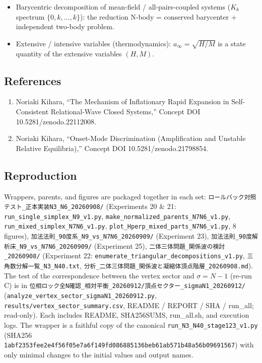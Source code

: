 \documentclass[
  a4paper,
]{ltjsarticle}
\providecommand{\tightlist}{%
  \setlength{\itemsep}{0pt}\setlength{\parskip}{0pt}}
\begin{document}
\begin{itemize}
\tightlist
\item
  Barycentric decomposition of mean-field / all-pairs-coupled systems
  (\(K_k\) spectrum \(\{0,k,\ldots,k\}\)): the reduction N-body =
  conserved barycenter + independent two-body problem.
\item
  Extensive / intensive variables (thermodynamics):
  \(a_\infty=\sqrt{H/M}\) is a state quantity of the extensive variables
  \((H,M)\).
\end{itemize}

\subsection{References}\label{references}

\begin{enumerate}
\def\labelenumi{\arabic{enumi}.}
\tightlist
\item
  Noriaki Kihara, ``The Mechanism of Inflationary Rapid Expansion in
  Self-Consistent Relational-Wave Closed Systems,'' Concept DOI
  10.5281/zenodo.22112008.
\item
  Noriaki Kihara, ``Onset-Mode Discrimination (Amplification and
  Unstable Relative Equilibria),'' Concept DOI 10.5281/zenodo.21798854.
\end{enumerate}

\subsection{Reproduction}\label{reproduction}

Wrappers, parents, and figures are packaged together in each set:
\texttt{ロールバック対照テスト\_正本実装N3\_N6\_20260908/} (Experiments
20 \& 21: \texttt{run\_single\_simplex\_N9\_v1.py},
\texttt{make\_normalized\_parents\_N7N6\_v1.py},
\texttt{run\_mixed\_simplex\_N7N6\_v1.py},
\texttt{plot\_Hperp\_mixed\_parts\_N7N6\_v1.py}, 8 figures),
\texttt{加法法則\_90度系\_N9\_vs\_N7N6\_20260909/} (Experiment 23),
\texttt{加法法則\_90度解析床\_N9\_vs\_N7N6\_20260909/} (Experiment 25),
\texttt{二体三体問題\_関係波の検討\_20260908/} (Experiment 22:
\texttt{enumerate\_triangular\_decompositions\_v1.py},
\texttt{三角数分解一覧\_N3\_N40.txt},
\texttt{分析\_二体三体問題\_関係波と凝縮体頂点階層\_20260908.md}). The
test of the correspondence between the vertex sector and \(\sigma=N-1\)
(re-run C) is in
\texttt{位相ロック全N確認\_相対平衡\_20260912/頂点セクター\_sigmaN1\_20260912/}
(\texttt{analyze\_vertex\_sector\_sigmaN1\_20260912.py},
\texttt{results/vertex\_sector\_summary.csv}, README / REPORT / SHA /
run\_all; read-only). Each includes README, SHA256SUMS, run\_all.sh, and
execution logs. The wrapper is a faithful copy of the canonical
\texttt{run\_N3\_N40\_stage123\_v1.py} (SHA256
\texttt{1abf2353fee2e4f56f05e7a6f149fd086885136beb61ab571b48a56b09691567})
with only minimal changes to the initial values and output names.
\end{document}
